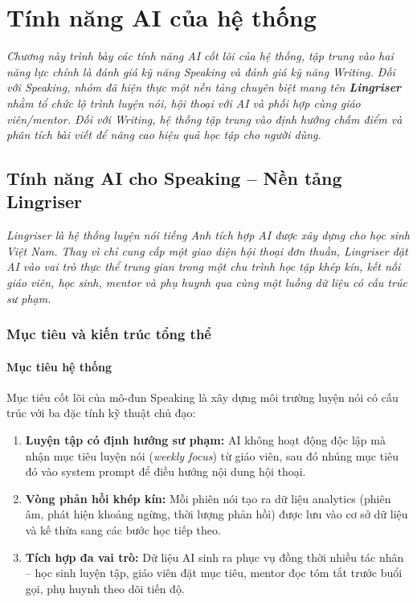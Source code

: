 \chapter{Tính năng AI của hệ thống}
\textit{Chương này trình bày các tính năng AI cốt lõi của hệ thống, tập trung vào hai năng lực chính là đánh giá kỹ năng Speaking và đánh giá kỹ năng Writing. Đối với Speaking, nhóm đã hiện thực một nền tảng chuyên biệt mang tên \textbf{Lingriser} nhằm tổ chức lộ trình luyện nói, hội thoại với AI và phối hợp cùng giáo viên/mentor. Đối với Writing, hệ thống tập trung vào định hướng chấm điểm và phân tích bài viết để nâng cao hiệu quả học tập cho người dùng.}


\section{Tính năng AI cho Speaking -- Nền tảng Lingriser}

\textit{Lingriser là hệ thống luyện nói tiếng Anh tích hợp AI được xây dựng cho học sinh Việt Nam. Thay vì chỉ cung cấp một giao diện hội thoại đơn thuần, Lingriser đặt AI vào vai trò thực thể trung gian trong một chu trình học tập khép kín, kết nối giáo viên, học sinh, mentor và phụ huynh qua cùng một luồng dữ liệu có cấu trúc sư phạm.}

\subsection{Mục tiêu và kiến trúc tổng thể}

\subsubsection{Mục tiêu hệ thống}

Mục tiêu cốt lõi của mô-đun Speaking là xây dựng môi trường luyện nói có cấu trúc với ba đặc tính kỹ thuật chủ đạo:

\begin{enumerate}
    \item \textbf{Luyện tập có định hướng sư phạm:} AI không hoạt động độc lập mà nhận mục tiêu luyện nói (\textit{weekly focus}) từ giáo viên, sau đó nhúng mục tiêu đó vào system prompt để điều hướng nội dung hội thoại.
    \item \textbf{Vòng phản hồi khép kín:} Mỗi phiên nói tạo ra dữ liệu analytics (phiên âm, phát hiện khoảng ngừng, thời lượng phản hồi) được lưu vào cơ sở dữ liệu và kế thừa sang các bước học tiếp theo.
    \item \textbf{Tích hợp đa vai trò:} Dữ liệu AI sinh ra phục vụ đồng thời nhiều tác nhân -- học sinh luyện tập, giáo viên đặt mục tiêu, mentor đọc tóm tắt trước buổi gọi, phụ huynh theo dõi tiến độ.
\end{enumerate}

